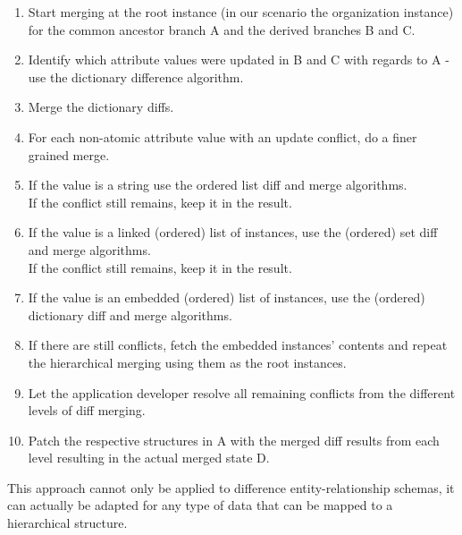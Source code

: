 \begin{enumerate}
\item Start merging at the root instance (in our scenario the organization instance) for the common ancestor branch A and the derived branches B and C.
\item Identify which attribute values were updated in B and C with regards to A - use the dictionary difference algorithm.
\item Merge the dictionary diffs.
\item For each non-atomic attribute value with an update conflict, do a finer grained merge.
\item If the value is a string use the ordered list diff and merge algorithms.\\
If the conflict still remains, keep it in the result.
\item If the value is a linked (ordered) list of instances, use the (ordered) set diff and merge algorithms.\\
If the conflict still remains, keep it in the result.
\item If the value is an embedded (ordered) list of instances, use the (ordered) dictionary diff and merge algorithms.
\item If there are still conflicts, fetch the embedded instances' contents and repeat the hierarchical merging using them as the root instances.
\item Let the application developer resolve all remaining conflicts from the different levels of diff merging.
\item Patch the respective structures in A with the merged diff results from each level resulting in the actual merged state D.
\end{enumerate}

This approach cannot only be applied to difference entity-relationship schemas, it can actually be adapted for any type of data that can be mapped to a hierarchical structure.
